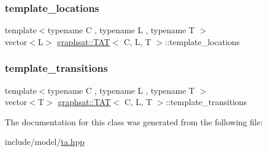 \mbox{\label{classgraphsat_1_1_t_a_t_ad3afd1fc9aa770065ed801819ed5b57b}} 
\subsubsection{\texorpdfstring{template\_locations}{template\_locations}}
{\footnotesize\ttfamily template$<$typename C , typename L , typename T $>$ \\
vector$<$L$>$ \mbox{\hyperlink{classgraphsat_1_1_t_a_t}{graphsat\+::\+T\+AT}}$<$ C, L, T $>$\+::template\+\_\+locations\hspace{0.3cm}{\ttfamily [private]}}

\mbox{\label{classgraphsat_1_1_t_a_t_a028831f531e7b7fcf99bc06b7f6927c7}} 
\subsubsection{\texorpdfstring{template\_transitions}{template\_transitions}}
{\footnotesize\ttfamily template$<$typename C , typename L , typename T $>$ \\
vector$<$T$>$ \mbox{\hyperlink{classgraphsat_1_1_t_a_t}{graphsat\+::\+T\+AT}}$<$ C, L, T $>$\+::template\+\_\+transitions\hspace{0.3cm}{\ttfamily [private]}}



The documentation for this class was generated from the following file\+:\begin{DoxyCompactItemize}
\item 
include/model/\mbox{\hyperlink{ta_8hpp}{ta.\+hpp}}\end{DoxyCompactItemize}
